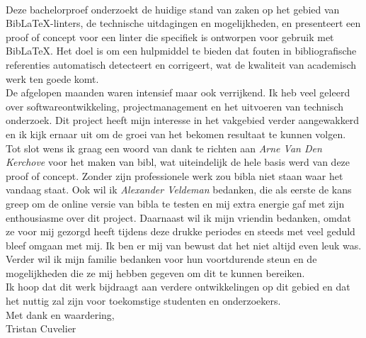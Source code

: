 \\ \newline{}
Deze bachelorproef onderzoekt de huidige stand van zaken op het gebied van BibLaTeX-linters, de technische uitdagingen en mogelijkheden, en presenteert een proof of concept voor een linter die specifiek is ontworpen voor gebruik met BibLaTeX. Het doel is om een hulpmiddel te bieden dat fouten in bibliografische referenties automatisch detecteert en corrigeert, wat de kwaliteit van academisch werk ten goede komt.
\\ \newline{}
De afgelopen maanden waren intensief maar ook verrijkend. Ik heb veel geleerd over softwareontwikkeling, projectmanagement en het uitvoeren van technisch onderzoek. Dit project heeft mijn interesse in het vakgebied verder aangewakkerd en ik kijk ernaar uit om de groei van het bekomen resultaat te kunnen volgen.
\\ \newline{}
Tot slot wens ik graag een woord van dank te richten aan \emph{Arne Van Den Kerchove} voor het maken van bibl, wat uiteindelijk de hele basis werd van deze proof of concept. Zonder zijn professionele werk zou bibla niet staan waar het vandaag staat. Ook wil ik \emph{Alexander Veldeman} bedanken, die als eerste de kans greep om de online versie van bibla te testen en mij extra energie gaf met zijn enthousiasme over dit project. Daarnaast wil ik mijn vriendin bedanken, omdat ze voor mij gezorgd heeft tijdens deze drukke periodes en steeds met veel geduld bleef omgaan met mij. Ik ben er mij van bewust dat het niet altijd even leuk was.
\\ \newline{}
Verder wil ik mijn familie bedanken voor hun voortdurende steun en de mogelijkheden die ze mij hebben gegeven om dit te kunnen bereiken.
\\ \newline{}
Ik hoop dat dit werk bijdraagt aan verdere ontwikkelingen op dit gebied en dat het nuttig zal zijn voor toekomstige studenten en onderzoekers.
\\ \newline{}
Met dank en waardering,
\\ \newline{}
Tristan Cuvelier

